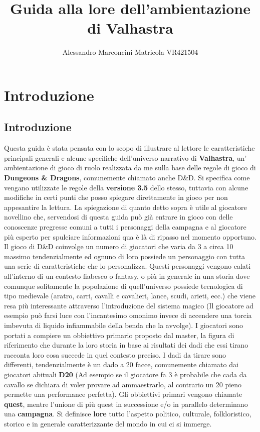 \documentclass[a4paper,12pt]{book}
\begin{document}
\title{Guida alla lore dell'ambientazione di Valhastra}
\author{Alessandro Marconcini Matricola VR421504}
\maketitle
\tableofcontents

\newcommand{\saltariga}{\medskip}

\saltariga
\chapter{Introduzione}
\section{Introduzione}

Questa guida è stata pensata con lo scopo di illustrare al lettore le caratteristiche principali generali e alcune specifiche dell'universo narrativo di \textbf{Valhastra}, un' ambientazione di gioco di ruolo realizzata da me sulla base delle regole di gioco di \textbf{Dungeons \& Dragons}, comunemente chiamato anche D\&D.
Si specifica come vengano utilizzate le regole della \textbf{versione 3.5} dello stesso, tuttavia con alcune modifiche in certi punti che posso spiegare direttamente in gioco per non appesantire la lettura.
La spiegazione di quanto detto sopra è utile al giocatore novellino che, servendosi di questa guida può già entrare in gioco con delle conoscenze pregresse comuni a tutti i personaggi della campagna  e al giocatore più esperto per spulciare informazioni qua è là di ripasso nel momento opportuno.
Il gioco di D\&D coinvolge un numero di giocatori che varia da 3 a circa 10 massimo tendenzialmente ed ognuno di loro possiede un personaggio con tutta una serie di caratteristiche che lo personalizza.
Questi personaggi vengono calati all'interno di un contesto fiabesco o fantasy, o più in generale in una storia dove comunque solitamente la popolazione di quell'universo possiede tecnologica di tipo medievale (aratro, carri, cavalli e cavalieri, lance, scudi, arieti, ecc.) che viene resa più interessante attraverso l'introduzione del sistema magico (Il giocatore ad esempio può farsi luce con l'incantesimo omonimo invece di accendere una torcia imbevuta di liquido infiammabile della benda che la avvolge).
I giocatori sono portati a compiere un obbiettivo primario proposto dal master, la figura di riferimento che durante la loro storia in base ai risultati dei dadi che essi tirano racconta loro cosa succede in quel contesto preciso.
I dadi da tirare sono differenti, tendenzialmente è un dado a 20 facce, comunemente chiamato dai giocatori abituali \textbf{D20} (Ad esempio se il giocatore fa 3 è probabile che cada da cavallo se dichiara di voler provare ad ammaestrarlo, al contrario un 20 pieno permette una performance perfetta).
Gli obbiettivi primari vengono chiamate \textbf{quest}, mentre l'unione di più quest in successione e/o in parallelo determinano una \textbf{campagna}.
Si definisce \textbf{lore} tutto l'aspetto politico, culturale, folkloristico, storico e in generale caratterizzante del mondo in cui ci si immerge.
\end{document}
